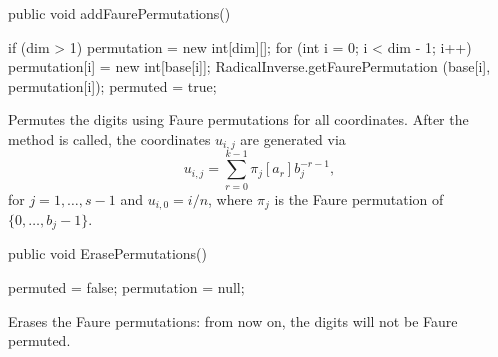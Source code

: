 \begin{code}

   public void addFaurePermutations()\begin{hide} {
      if (dim > 1) {
         permutation = new int[dim][];
         for (int i = 0; i < dim - 1; i++) {
            permutation[i] = new int[base[i]];
            RadicalInverse.getFaurePermutation (base[i], permutation[i]);
         }
      }
      permuted = true;
   }\end{hide}
\end{code}
 \begin{tabb}
  Permutes the digits using Faure permutations for all coordinates.
  After the method is called, the coordinates $u_{i,j}$ are generated via
\[
  u_{i,j} = \sum_{r=0}^{k-1} \pi_j[a_r] b_j^{-r-1},
\]
 for $j=1,\dots,s-1$ and $u_{i,0}=i/n$,
 where $\pi_j$ is the Faure permutation of $\{0,\dots,b_j-1\}$.
 \end{tabb}
\begin{code}

   public void ErasePermutations()\begin{hide} {
      permuted = false;
      permutation = null;
   }
\end{hide}
\end{code}
 \begin{tabb}
  Erases the Faure permutations: from now on, the digits will not be
  Faure permuted.
 \end{tabb}
\begin{code}
\begin{hide}

   public double getCoordinate (int i, int j) {
      if (j == 0)
         return (double) i / (double) numPoints;
      if (permuted)
         return RadicalInverse.permutedRadicalInverse 
                   (base[j - 1], permutation[j - 1], i);
      else 
         return RadicalInverse.radicalInverse (base[j - 1], i);
   }
}
\end{hide}
\end{code}
